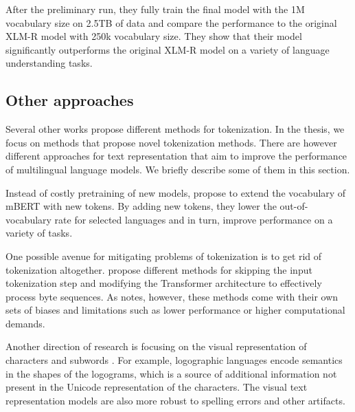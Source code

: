 After the preliminary run, they fully train the final model with the 1M vocabulary size on 2.5TB of data and compare the performance to the original XLM-R model with 250k vocabulary size. They show that their model significantly outperforms the original XLM-R model on a variety of language understanding tasks.




\subsection{Other approaches}

Several other works propose different methods for tokenization. In the thesis, we focus on methods that propose novel tokenization methods. There are however different approaches for text representation that aim to improve the performance of multilingual language models. We briefly describe some of them in this section.

Instead of costly pretraining of new models, \citet{wang_improving_2019} propose to extend the vocabulary of mBERT with new tokens. By adding new tokens, they lower the out-of-vocabulary rate for selected languages and in turn, improve performance on a variety of tasks. 

One possible avenue for mitigating problems of tokenization is to get rid of tokenization altogether. \citet{clark_canine_2022,tay_charformer_2022,xue_byt5_2022} propose different methods for skipping the input tokenization step and modifying the Transformer architecture to effectively process byte sequences. As \citet{mielke_between_2021} notes, however, these methods come with their own sets of biases and limitations such as lower performance or higher computational demands. 

Another direction of research is focusing on the visual representation of characters and subwords \cite{rust_language_2023,salesky_robust_2021,mansimov_towards_2020}. For example, logographic languages encode semantics in the shapes of the logograms, which is a source of additional information not present in the Unicode representation of the characters. The visual text representation models are also more robust to spelling errors and other artifacts.


